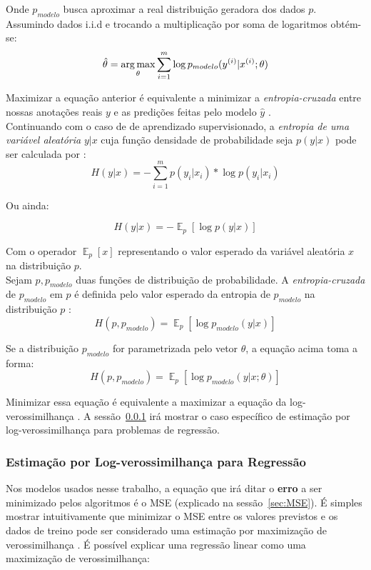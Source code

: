 Onde $p_{modelo}$ busca aproximar a real distribuição geradora dos dados $p$. Assumindo dados i.i.d e trocando a multiplicação por soma de logaritmos obtém-se: \\

\[ \hat{\theta} = \operatorname*{arg\,max}_{\theta} \sum_{i=1}^{m} \log p_{modelo}(y^{(i)}| x^{(i)};\theta) \]

Maximizar a equação anterior é equivalente a minimizar a \textit{entropia-cruzada} entre
nossas anotações reais $y$ e as predições feitas pelo modelo $\hat{y}$
\citep{dlbook}. \\

Continuando com o caso de de aprendizado supervisionado, a \textit{entropia de uma variável aleatória} $y | x$ cuja função densidade
de probabilidade seja $p(y | x)$ pode ser calculada por \citep{shannon2001mathematical}: \\

\[ H(y | x)  = - \sum^m_{i=1} p(y_i | x_i)*\log p(y_i | x_i) \]

Ou ainda:

\[H(y | x) = - \mathop{\mathbb{E}}_p[\log p(y | x)] \]

Com o operador $\mathop{\mathbb{E}}_p[x]$ representando o valor esperado da
variável aleatória $x$ na distribuição $p$. \\

Sejam $p,p_{modelo}$ duas funções de distribuição de probabilidade. A \textit{entropia-cruzada} de $p_{modelo}$ em $p$ é definida pelo valor
esperado da entropia de $p_{modelo}$ na distribuição $p$ \citep{bayesml}: \\

\[H(p,p_{modelo}) =  \mathop{\mathbb{E}}_p[\log p_{modelo}(y | x)] \]

Se a distribuição $p_{modelo}$ for parametrizada pelo vetor $\theta$, a equação
acima toma a forma: \\


\[H(p,p_{modelo}) =  \mathop{\mathbb{E}}_p[\log p_{modelo}(y | x ; \theta)] \]

Minimizar essa equação é equivalente a maximizar a equação da
log-verossimilhança \citep{dlbook}. A sessão~\ref{sec:reglog} irá mostrar o caso
específico de estimação por log-verossimilhança para problemas de regressão.  

\subsubsection{Estimação por Log-verossimilhança para Regressão}
\label{sec:reglog}
Nos modelos usados nesse trabalho, a equação que irá ditar o \textbf{erro} a ser
minimizado pelos algoritmos é o MSE (explicado na sessão~\ref{sec:MSE}). 
É simples mostrar intuitivamente que minimizar o MSE entre os valores previstos
e os dados de treino pode ser considerado uma estimação por maximização de
verossimilhança \citep{dlbook}. É possível explicar uma regressão linear como
uma maximização de verossimilhança:
\\

